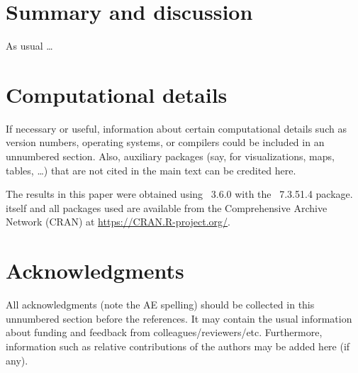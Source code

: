 \documentclass[article]{jss}
\begin{document}
\section{Summary and discussion} \label{sec:summary}

\begin{leftbar}
As usual \dots
\end{leftbar}



\section*{Computational details}

\begin{leftbar}
If necessary or useful, information about certain computational details
such as version numbers, operating systems, or compilers could be included
in an unnumbered section. Also, auxiliary packages (say, for visualizations,
maps, tables, \dots) that are not cited in the main text can be credited here.
\end{leftbar}

The results in this paper were obtained using
~3.6.0 with the
~7.3.51.4 package.  itself
and all packages used are available from the Comprehensive
 Archive Network (CRAN) at
\url{https://CRAN.R-project.org/}.

\section*{Acknowledgments}

\begin{leftbar}
All acknowledgments (note the AE spelling) should be collected in this
unnumbered section before the references. It may contain the usual information
about funding and feedback from colleagues/reviewers/etc. Furthermore,
information such as relative contributions of the authors may be added here
(if any).
\end{leftbar}


\end{document}
